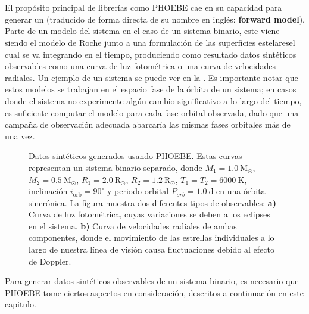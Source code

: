 \section{}

El propósito principal de librerías como PHOEBE cae en su capacidad para generar
un  (traducido de forma directa de su nombre
en inglés: \textbf{forward model}). Parte de un modelo del sistema\textemdash
en el caso de un sistema binario, este viene siendo el modelo de Roche junto a
una formulación de las superficies estelares\textemdash el cual se va integrando
en el tiempo, produciendo como resultado datos sintéticos observables como una
curva de luz fotométrica o una curva de velocidades radiales. Un ejemplo de un
sistema  se puede ver en la
. Es importante notar que estos
modelos se trabajan en el espacio fase de la órbita de un sistema; en casos
donde el sistema no experimente algún cambio significativo a lo largo del
tiempo, es suficiente computar el modelo para cada fase orbital observada, dado
que una campaña de observación adecuada abarcaría las mismas fases orbitales más
de una vez.

\begin{figure}[!ht]
	\centering
	\caption{Datos sintéticos generados usando PHOEBE. Estas curvas representan
	un sistema binario separado, donde $M_1 = 1.0 \ \mathrm{M}_{\odot}$, $M_2 =
	0.5 \ \mathrm{M}_{\odot}$, $R_1 = 2.0 \ \mathrm{R}_{\odot}$, $R_2 = 1.2 \
	\mathrm{R}_{\odot}$, $T_1 = T_2 = 6000 \ \mathrm{K}$, inclinación
	$i_{\mathrm{orb}} = 90^{\circ}$ y periodo orbital $P_{orb} = 1.0 \
	\mathrm{d}$ en una órbita sincrónica. La figura muestra dos diferentes tipos
	de observables: \textbf{a)} Curva de luz fotométrica, cuyas variaciones se
	deben a los eclipses en el sistema. \textbf{b)} Curva de velocidades
	radiales de ambas componentes, donde el movimiento de las estrellas
	individuales a lo largo de nuestra línea de visión causa fluctuaciones
	debido al efecto de Doppler.} 
	\label{figuraPhoebeObservablesSinteticos}
\end{figure}

Para generar datos sintéticos observables de un sistema binario, es necesario
que PHOEBE tome ciertos aspectos en consideración, descritos a continuación en
este capitulo.


